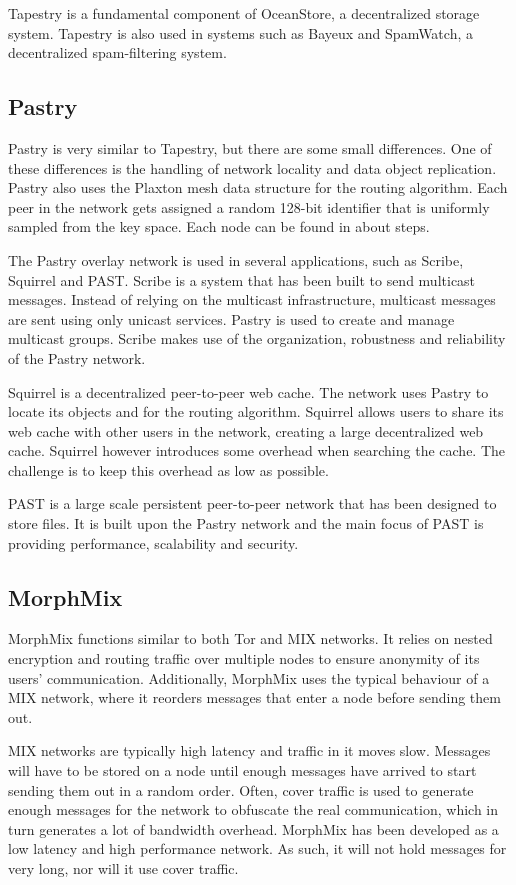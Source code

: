 \documentclass[12pt,journal,compsoc]{IEEEtran}
\begin{document}
		Tapestry is a fundamental component of OceanStore, a decentralized storage system. Tapestry is also used in systems such as Bayeux and SpamWatch, a decentralized spam-filtering system.

	\subsection{Pastry} Pastry is very similar to Tapestry, but there are some small differences. One of these differences is the handling of network locality and data object replication. Pastry also uses the Plaxton mesh data structure for the routing algorithm. Each peer in the network gets assigned a random 128-bit identifier that is uniformly sampled from the key space. Each node can be found in about  steps.

		The Pastry overlay network is used in several applications, such as Scribe, Squirrel and PAST. Scribe is a system that has been built to send multicast messages. Instead of relying on the multicast infrastructure, multicast messages are sent using only unicast services. Pastry is used to create and manage multicast groups. Scribe makes use of the organization, robustness and reliability of the Pastry network.

		Squirrel is a decentralized peer-to-peer web cache. The network uses Pastry to locate its objects and for the routing algorithm. Squirrel allows users to share its web cache with other users in the network, creating a large decentralized web cache. Squirrel however introduces some overhead when searching the cache. The challenge is to keep this overhead as low as possible.

		PAST is a large scale persistent peer-to-peer network that has been designed to store files. It is built upon the Pastry network and the main focus of PAST is providing performance, scalability and security.
			
	\subsection{MorphMix} MorphMix \cite{rennhard2002introducing} functions similar to both Tor and MIX networks. It relies on nested encryption and routing traffic over multiple nodes to ensure anonymity of its users' communication. Additionally, MorphMix uses the typical behaviour of a MIX network, where it reorders messages that enter a node before sending them out.
		
		MIX networks are typically high latency and traffic in it moves slow. Messages will have to be stored on a node until enough messages have arrived to start sending them out in a random order. Often, cover traffic is used to generate enough messages for the network to obfuscate the real communication, which in turn generates a lot of bandwidth overhead. MorphMix has been developed as a low latency and high performance network. As such, it will not hold messages for very long, nor will it use cover traffic.
		
\end{document}

